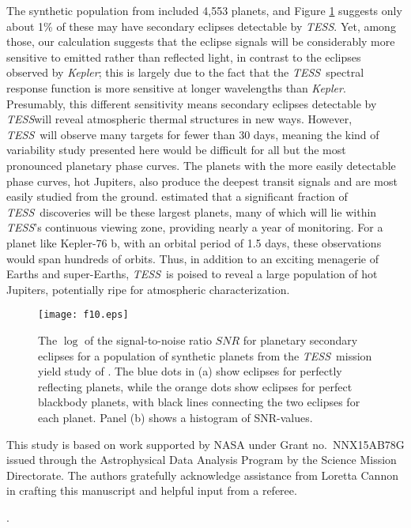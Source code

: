 \documentclass[manuscript]{aastex62}
\newcommand{\kepler}{{\it Kepler}}
\newcommand{\tess}{{\it TESS}}
\begin{document}
The synthetic population from \citet{2018ApJS..239....2B} included 4,553 planets, and Figure \ref{fig:eclipse_estimates} suggests only about 1\% of these may have secondary eclipses detectable by \tess. Yet, among those, our calculation suggests that the eclipse signals will be considerably more sensitive to emitted rather than reflected light, in contrast to the eclipses observed by \kepler; this is largely due to the fact that the \tess\ spectral response function is more sensitive at longer wavelengths than \kepler. Presumably, this different sensitivity means secondary eclipses detectable by \tess will reveal atmospheric thermal structures in new ways. However, \tess\ will observe many targets for fewer than 30 days, meaning the kind of variability study presented here would be difficult for all but the most pronounced planetary phase curves. The planets with the more easily detectable phase curves, hot Jupiters, also produce the deepest transit signals and are most easily studied from the ground. \citet{2018ApJS..239....2B} estimated that a significant fraction of \tess\ discoveries will be these largest planets, many of which will lie within \tess's continuous viewing zone, providing nearly a year of monitoring. For a planet like Kepler-76 b, with an orbital period of 1.5 days, these observations would span hundreds of orbits. Thus, in addition to an exciting menagerie of Earths and super-Earths, \tess\ is poised to reveal a large population of hot Jupiters, potentially ripe for atmospheric characterization. 

\begin{figure}
\texttt{[image: f10.eps]}
\caption{The $\log$ of the signal-to-noise ratio $SNR$ for planetary secondary eclipses for a population of synthetic planets from the \tess\ mission yield study of \citet{2018ApJS..239....2B}. The blue dots in (a) show eclipses for perfectly reflecting planets, while the orange dots show eclipses for perfect blackbody planets, with black lines connecting the two eclipses for each planet. Panel (b) shows a histogram of SNR-values. \label{fig:eclipse_estimates}}
\end{figure}

\acknowledgments 
This study is based on work supported by NASA under Grant no.~NNX15AB78G issued through the Astrophysical Data Analysis Program by the Science Mission Directorate. The authors gratefully acknowledge assistance from Loretta Cannon in crafting this manuscript and helpful input from a referee.



.



\end{document}
